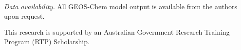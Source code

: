 \documentclass[acp, manuscript]{copernicus} %
\begin{document}
  
\conclusions  %


\appendix

\appendixfigures  %
\appendixtables   %

\authorcontribution{}



%
\textit{Data availability.} All GEOS-Chem model output is available from the authors upon request.

\begin{acknowledgements}
This research is supported by an Australian Government Research Training Program (RTP) Scholarship.
\end{acknowledgements}



\end{document}
